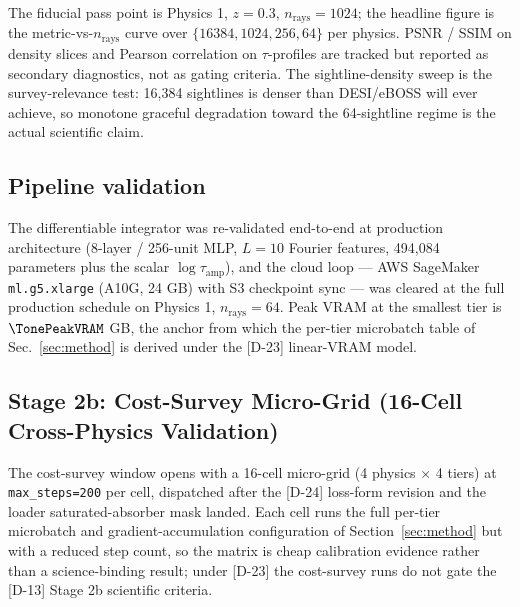 The fiducial pass point is Physics 1, $z = 0.3$, $n_{\text{rays}} = 1024$; the headline figure is the metric-vs-$n_{\text{rays}}$ curve over $\{16384, 1024, 256, 64\}$ per physics. PSNR / SSIM on density slices and Pearson correlation on $\tau$-profiles are tracked but reported as secondary diagnostics, not as gating criteria. The sightline-density sweep is the survey-relevance test: 16{,}384 sightlines is denser than DESI/eBOSS will ever achieve, so monotone graceful degradation toward the 64-sightline regime is the actual scientific claim.

\subsection{Pipeline validation}
The differentiable integrator was re-validated end-to-end at production architecture (8-layer / 256-unit MLP, $L = 10$ Fourier features, 494{,}084 parameters plus the scalar $\log\tau_{\text{amp}}$), and the cloud loop --- AWS SageMaker \texttt{ml.g5.xlarge} (A10G, 24 GB) with S3 checkpoint sync --- was cleared at the full production schedule on Physics 1, $n_{\text{rays}} = 64$. Peak VRAM at the smallest tier is $\TonePeakVRAM$ GB, the anchor from which the per-tier microbatch table of Sec.~\ref{sec:method} is derived under the [D-23] linear-VRAM model.

\subsection{Stage 2b: Cost-Survey Micro-Grid (16-Cell Cross-Physics Validation)}
\label{sec:exp:microgrid}
The cost-survey window opens with a 16-cell micro-grid (4 physics $\times$ 4 tiers) at \texttt{max\_steps=200} per cell, dispatched after the [D-24] loss-form revision and the loader saturated-absorber mask landed. Each cell runs the full per-tier microbatch and gradient-accumulation configuration of Section~\ref{sec:method} but with a reduced step count, so the matrix is cheap calibration evidence rather than a science-binding result; under [D-23] the cost-survey runs do not gate the [D-13] Stage 2b scientific criteria.

